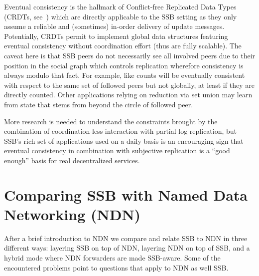 \documentclass[10pt,sigconf,rewiew]{acmart}
\begin{document}
Eventual consistency is the hallmark of Conflict-free Replicated Data
Types (CRDTs, see~\cite{shapiro2011conflict}) which are directly applicable to the SSB
setting as they only assume a reliable and (sometimes) in-order
delivery of update messages. Potentially, CRDTs permit to implement
global data structures featuring eventual consistency without
coordination effort (thus are fully scalable). The caveat here is that
SSB peers do not necessarily see all involved peers due to their
position in the social graph which controls replication wherefore
consistency is always modulo that fact. For example, like counts will
be eventually consistent with respect to the same set of followed
peers but not globally, at least if they are directly counted. Other
applications relying on reduction via set union may learn from state
that stems from beyond the circle of followed peer.

More research is needed to understand the constraints brought by the combination of
coordination-less interaction with partial log replication, but SSB's
rich set of applications used on a daily basis is an encouraging sign
that eventual consistency in combination with subjective replication
is a ``good enough'' basis for real decentralized services.





\section{Comparing SSB with Named Data Networking (NDN)}
\label{sect:NDN}

After a brief introduction to NDN we compare and relate SSB to NDN in
three different ways: layering SSB on top of NDN, layering NDN on top
of SSB, and a hybrid mode where NDN forwarders are made SSB-aware.
Some of the encountered problems point to questions that apply to NDN
as well SSB.
\end{document}
